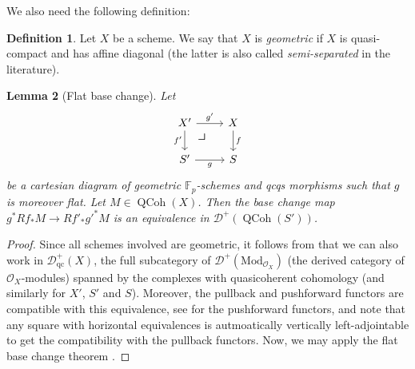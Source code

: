 \documentclass{article}
\theoremstyle{definition}
\newtheorem{defn}{Definition}[section]
\theoremstyle{definition}
\theoremstyle{definition}
\theoremstyle{plain}
\newtheorem{lem}[defn]{Lemma}
\theoremstyle{plain}
\theoremstyle{plain}
\theoremstyle{plain}
\theoremstyle{plain}
\theoremstyle{plain}
\theoremstyle{plain}
\theoremstyle{plain}
\theoremstyle{remark}
\theoremstyle{remark}
\theoremstyle{plain}
\theoremstyle{plain}
\theoremstyle{plain}
\theoremstyle{plain}
\theoremstyle{plain}
\newcommand{\Fp}{\mathbb{F}_p}
\newcommand{\cartsymb}{\arrow[dr, phantom,"\scalebox{1.5}{\color{black}$\lrcorner$}", near start, color=black]}
\newcommand{\QCoh}[1]{\operatorname{QCoh}(#1)}
\newcommand{\Cat}[1]{\mathcal{#1}}
\begin{document}
We also need the following definition:
\begin{defn} \label{def:zariski:geometric}
    Let $X$ be a scheme. We say that $X$ is \emph{geometric} 
    if $X$ is quasi-compact and has affine diagonal (the latter is also called 
    \emph{semi-separated} in the literature).
\end{defn}

\begin{lem}[Flat base change] \label{lem:zariski:flat-base-change-qcoh}
        Let
    \[\begin{tikzcd}
        X' \ar[r, "g'"] \ar[d, "f'"'] \cartsymb & X \ar[d, "f"] \\
        S' \ar[r, "g"'] & S
    \end{tikzcd}\]
    be a cartesian diagram of geometric $\Fp$-schemes and qcqs morphisms such that $g$ is moreover flat.
    Let $M \in \QCoh{X}$.
    Then the base change map $g^* Rf_* M \to Rf'_* g'^* M$ is an equivalence in $\Cat D^+ (\QCoh{S'})$.
\end{lem}
\begin{proof}
    Since all schemes involved are geometric, it follows from \cite[\href{https://stacks.math.columbia.edu/tag/08DB}{Tag 08DB}]{stacks-project}
    that we can also work in $\Cat D^+_{\mathrm{qc}}(X)$, the full subcategory 
    of $\Cat D^+(\mathrm{Mod}_{\Cat O_X})$ (the derived category of $\Cat O_X$-modules) 
    spanned by the complexes with quasicoherent cohomology (and similarly for $X'$, $S'$ and $S$).
    Moreover, the pullback and pushforward functors are compatible with this equivalence, see 
    \cite[\href{https://stacks.math.columbia.edu/tag/0CRX}{Tag 0CRX}]{stacks-project} for the pushforward functors, and note that any square with horizontal equivalences is autmoatically vertically left-adjointable 
    to get the compatibility with the pullback functors.
    Now, we may apply the flat base change theorem \cite[\href{https://stacks.math.columbia.edu/tag/02KH}{Tag 02KH}]{stacks-project}.
\end{proof}
\end{document}
